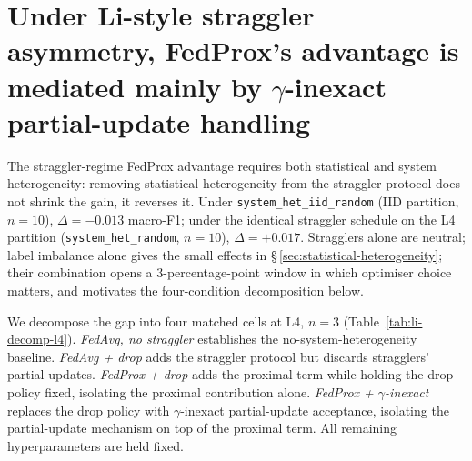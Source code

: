
\section{Under Li-style straggler asymmetry, FedProx's advantage is mediated
mainly by $\gamma$-inexact partial-update handling}
\label{sec:li-straggler}

The straggler-regime FedProx advantage requires both statistical and system
heterogeneity: removing statistical heterogeneity from the straggler
protocol does not shrink the gain, it reverses it. Under
\texttt{system\_het\_iid\_random} (IID partition, $n=10$), $\Delta = -0.013$
macro-F1; under the identical straggler schedule on the L4 partition
(\texttt{system\_het\_random}, $n=10$), $\Delta = +0.017$. Stragglers alone
are neutral; label imbalance alone gives the small effects in
\S\,\ref{sec:statistical-heterogeneity}; their combination opens a
$3$-percentage-point window in which optimiser choice matters, and
motivates the four-condition decomposition below.

We decompose the gap into four matched cells at L4, $n=3$
(Table~\ref{tab:li-decomp-l4}). \emph{FedAvg, no straggler} establishes the
no-system-heterogeneity baseline. \emph{FedAvg + drop} adds the straggler
protocol but discards stragglers' partial updates. \emph{FedProx + drop}
adds the proximal term while holding the drop policy fixed, isolating the
proximal contribution alone. \emph{FedProx + $\gamma$-inexact} replaces the
drop policy with $\gamma$-inexact partial-update acceptance, isolating the
partial-update mechanism on top of the proximal term. All remaining
hyperparameters are held fixed.

